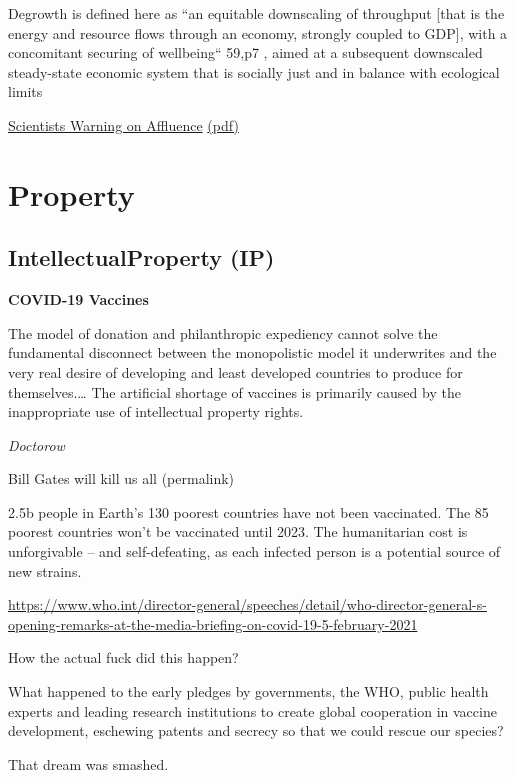 \documentclass[
]{book}
\begin{document}
Degrowth is defined here as ``an equitable
downscaling of throughput {[}that is the energy and resource flows
through an economy, strongly coupled to GDP{]}, with a
concomitant securing of wellbeing`` 59,p7 , aimed at a subsequent
downscaled steady-state economic system that is socially just and
in balance with ecological limits

\href{https://www.nature.com/articles/s41467-020-16941-y}{Scientists Warning on Affluence}
\href{/pdf/Wiedmann_2020_Scientists_Warning_on_Affluence.pdf}{(pdf)}

\hypertarget{property}{%
\chapter{Property}\label{property}}

\hypertarget{intellectualproperty-ip}{%
\section{IntellectualProperty (IP)}\label{intellectualproperty-ip}}

\textbf{COVID-19 Vaccines}

The model of donation and philanthropic expediency cannot solve the fundamental disconnect between the monopolistic model it underwrites and the very real desire of developing and least developed countries to produce for themselves.\ldots{} The artificial shortage of vaccines is primarily caused by the inappropriate use of intellectual property rights.

\emph{Doctorow}

Bill Gates will kill us all (permalink)

2.5b people in Earth's 130 poorest countries have not been vaccinated. The 85 poorest countries won't be vaccinated until 2023. The humanitarian cost is unforgivable -- and self-defeating, as each infected person is a potential source of new strains.

\url{https://www.who.int/director-general/speeches/detail/who-director-general-s-opening-remarks-at-the-media-briefing-on-covid-19-5-february-2021}

How the actual fuck did this happen?

What happened to the early pledges by governments, the WHO, public health experts and leading research institutions to create global cooperation in vaccine development, eschewing patents and secrecy so that we could rescue our species?

That dream was smashed.
\end{document}
